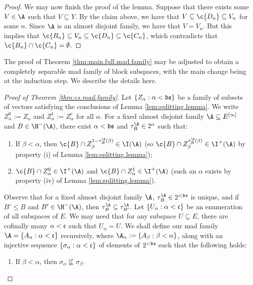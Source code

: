 \documentclass[11pt,reqno]{amsart}
\begin{document}
\begin{proof}
    We may now finish the proof of the lemma. Suppose that there exists some $V \in \A$ such that $V \subseteq Y$. By the claim above, we have that $V \subseteq \c{D_n} \subseteq V_n$ for some $n$. Since $\A$ is an almost disjoint family, we have that $V = V_n$. But this implies that $\c{B_n} \subseteq V_n \subseteq \c{D_n} \subseteq \c{C_n}$, which contradicts that $\c{B_n} \cap \c{C_n} = \emptyset$. 
\end{proof}

The proof of Theorem \ref{thm:main.full.mad.family} may be adjusted to obtain a completely separable mad family of block subspaces, with the main change being at the induction step. We describe the details here.

\begin{proof}[Proof of Theorem \ref{thm:cs.mad.family}]
    Let $\{Z_\alpha : \alpha < \frak{bs}\}$ be a family of subsets of vectors satisfying the conclusions of Lemma \ref{lem:splitting.lemma}. We write $Z_\alpha^0 := Z_\alpha$ and $Z_\alpha^1 := Z_\alpha^c$ for all $\alpha$. For a fixed almost disjoint family $\A \subseteq E^{[\infty]}$ and $B \in \H^-(\A)$, there exist $\alpha < \frak{bs}$ and $\tau_B^\A \in 2^\alpha$ such that:
    \begin{enumerate}
        \item If $\beta < \alpha$, then $\c{B} \cap Z_\beta^{1-\tau_B^\A(\beta)} \in \I(\A)$ (so $\c{B} \cap Z_\beta^{\tau_B^\A(\beta)} \in \I^+(\A)$ by property (i) of Lemma \ref{lem:splitting.lemma});

        \item $\c{B} \cap Z_\alpha^0 \in \I^+(\A)$ and $\c{B} \cap Z_\alpha^1 \in \I^+(\A)$ (such an $\alpha$ exists by property (iv) of Lemma \ref{lem:splitting.lemma}). 
    \end{enumerate}
    Observe that for a fixed almost disjoint family $\A$, $\tau_B^\A \in 2^{<\frak{bs}}$ is unique, and if $B' \leq B$ and $B' \in \H^-(\A)$, then $\tau_B^\A \subseteq \tau_{B'}^\A$. Let $\{U_\alpha : \alpha < \frak{c}\}$ be an enumeration of all subspaces of $E$. We may need that for any subspace $U \subseteq E$, there are cofinally many $\alpha < \frak{c}$ such that $U_\alpha = U$. We shall define our mad family $\A = \{A_\alpha : \alpha < \frak{c}\}$ recursively, where $\A_\alpha := \{A_\beta : \beta < \alpha\}$, along with an injective sequence $\{\sigma_\alpha : \alpha < \frak{c}\}$ of elements of $2^{<\frak{bs}}$ such that the following holds:
    \begin{enumerate}
        \item If $\beta < \alpha$, then $\sigma_\alpha \not\sqsubseteq \sigma_\beta$.


\end{enumerate}
\end{proof}
\end{document}
